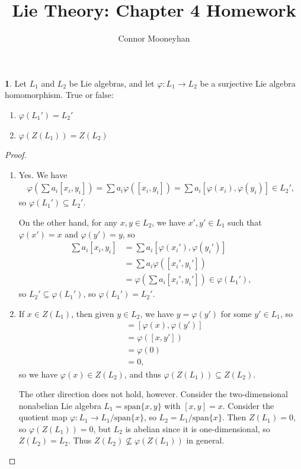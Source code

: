 \documentclass[12pt]{article}
\title{Lie Theory: Chapter 4 Homework}
\author{Connor Mooneyhan}
\date{}
\theoremstyle{definition}
\newtheorem{ex}{}
\begin{document}
\maketitle

\begin{ex}
	Let $L_1$ and $L_2$ be Lie algebras, and let $\varphi : L_1 \to L_2$ be a surjective Lie algebra homomorphism.
	True or false:\begin{enumerate}[label=(\alph*)]
		\item $\varphi(L_1') = L_2'$
		\item $\varphi(Z(L_1)) = Z(L_2)$
	\end{enumerate}
\end{ex}
\begin{proof}\
	\begin{enumerate}[label=(\alph*)]
		\item Yes.
		      We have \begin{align*}
			      \varphi\left(\sum a_i [x_i, y_i]\right) = \sum a_i \varphi([x_i, y_i]) = \sum a_i [\varphi(x_i), \varphi(y_i)] \in L_2',
		      \end{align*}
		      so $\varphi(L_1') \subseteq L_2'$.

		      On the other hand, for any $x, y \in L_2$, we have $x', y' \in L_1$ such that $\varphi(x') = x$ and $\varphi(y') = y$, so \begin{align*}
			      \sum a_i [x_i, y_i] & = \sum a_i [\varphi(x_i'), \varphi(y_i')]                        \\
			                          & = \sum a_i \varphi([x_i', y_i'])                                 \\
			                          & = \varphi\left( \sum a_i [x_i', y_i'] \right) \in \varphi(L_1'),
		      \end{align*}
		      so $L_2' \subseteq \varphi(L_1')$, so $\varphi(L_1') = L_2'$.
		\item If $x \in Z(L_1)$, then given $y \in L_2$, we have $y = \varphi(y')$ for some $y' \in L_1$, so \begin{align*}
			      [\varphi(x), y] & = [\varphi(x), \varphi(y')] \\
			                      & = \varphi([x, y'])          \\
			                      & = \varphi(0)                \\
			                      & = 0,
		      \end{align*}
		      so we have $\varphi(x) \in Z(L_2)$, and thus $\varphi(Z(L_1)) \subseteq Z(L_2)$.

		      The other direction does not hold, however.
		      Consider the two-dimensional nonabelian Lie algebra $L_1 = \mathrm{span}\lbrace x, y \rbrace$ with $[x, y] = x$.
		      Consider the quotient map $\varphi : L_1 \to L_1 / \mathrm{span}\lbrace x \rbrace$, so $L_2 = L_1 / \mathrm{span}\lbrace x\rbrace$.
		      Then $Z(L_1) = 0$, so $\varphi(Z(L_1)) = 0$, but $L_2$ is abelian since it is one-dimensional, so $Z(L_2) = L_2$.
		      Thus $Z(L_2) \not\subseteq \varphi(Z(L_1))$ in general.
	\end{enumerate}
\end{proof}
\end{document}
